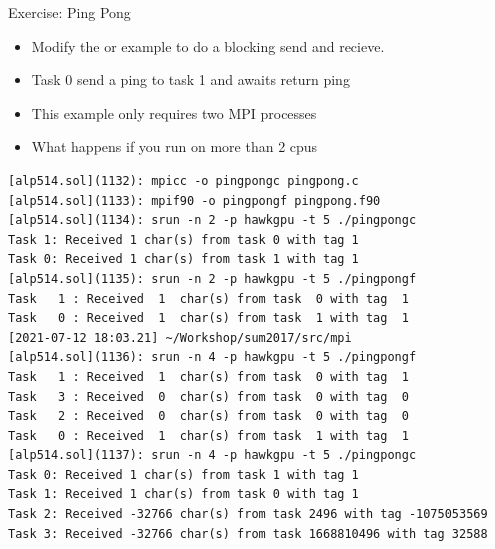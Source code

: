\documentclass[10pt,t]{beamer}
\begin{document}
\begin{frame}{Exercise: Ping Pong}
  \begin{itemize}
    \item Modify the  or  example to do a blocking send and recieve.
    \item Task 0 send a ping to task 1 and awaits return ping
    \item This example only requires two MPI processes
    \item What happens if you run on more than 2 cpus
  \end{itemize}
  \framebreak
  \begin{lstlisting}[basicstyle=\scriptsize\ttfamily]
[alp514.sol](1132): mpicc -o pingpongc pingpong.c
[alp514.sol](1133): mpif90 -o pingpongf pingpong.f90
[alp514.sol](1134): srun -n 2 -p hawkgpu -t 5 ./pingpongc
Task 1: Received 1 char(s) from task 0 with tag 1
Task 0: Received 1 char(s) from task 1 with tag 1
[alp514.sol](1135): srun -n 2 -p hawkgpu -t 5 ./pingpongf
Task   1 : Received  1  char(s) from task  0 with tag  1
Task   0 : Received  1  char(s) from task  1 with tag  1
[2021-07-12 18:03.21] ~/Workshop/sum2017/src/mpi
[alp514.sol](1136): srun -n 4 -p hawkgpu -t 5 ./pingpongf
Task   1 : Received  1  char(s) from task  0 with tag  1
Task   3 : Received  0  char(s) from task  0 with tag  0
Task   2 : Received  0  char(s) from task  0 with tag  0
Task   0 : Received  1  char(s) from task  1 with tag  1
[alp514.sol](1137): srun -n 4 -p hawkgpu -t 5 ./pingpongc
Task 0: Received 1 char(s) from task 1 with tag 1
Task 1: Received 1 char(s) from task 0 with tag 1
Task 2: Received -32766 char(s) from task 2496 with tag -1075053569
Task 3: Received -32766 char(s) from task 1668810496 with tag 32588
  \end{lstlisting}
\end{frame}
\end{document}
